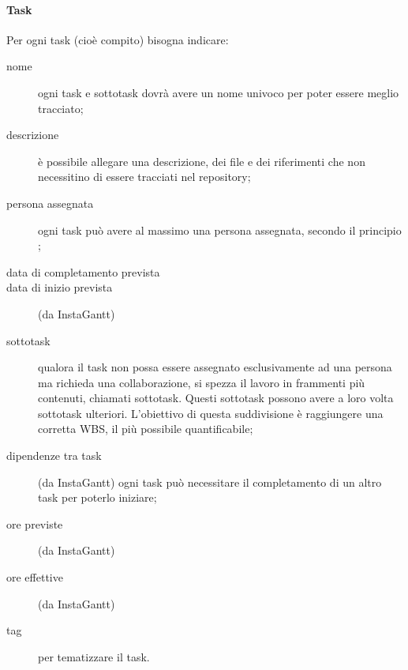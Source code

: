 \paragraph{Task} Per ogni task (cioè compito) bisogna indicare:
\begin{description}
	\item[nome] ogni task e sottotask dovrà avere un nome univoco per poter essere meglio tracciato;
	\item[descrizione] è possibile allegare una descrizione, dei file e dei riferimenti che non necessitino di essere tracciati nel repository;
	\item[persona assegnata] ogni task può avere al massimo una persona assegnata, secondo il principio ; 
	\item[data di completamento prevista]
	\item[data di inizio prevista] (da InstaGantt)
	\item[sottotask] qualora il task non possa essere assegnato esclusivamente ad una persona ma richieda una collaborazione, si spezza il lavoro in frammenti più contenuti, chiamati sottotask. Questi sottotask possono avere a loro volta sottotask ulteriori. L'obiettivo di questa suddivisione è raggiungere una corretta WBS, il più possibile quantificabile;
	\item[dipendenze tra task] (da InstaGantt) ogni task può necessitare il completamento di un altro task per poterlo iniziare;
	\item[ore previste] (da InstaGantt)
	\item[ore effettive] (da InstaGantt)
	\item[tag] per tematizzare il task.
\end{description}

